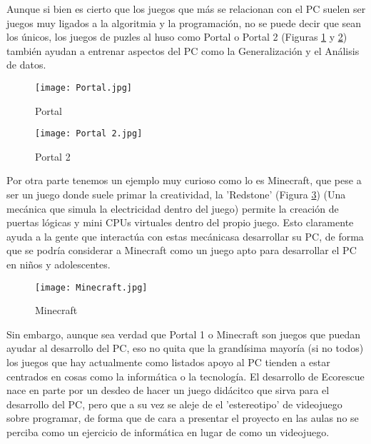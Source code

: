 Aunque si bien es cierto que los juegos que más se relacionan con el PC suelen ser juegos muy ligados a la algoritmia y la programación, no se puede decir que sean los únicos, los juegos de puzles al huso como Portal\cite{portal} o Portal 2\cite{portal2} (Figuras \ref{fig:portal} y \ref{fig:portal2}) también ayudan a entrenar aspectos del PC como la Generalización y el Análisis de datos.

\begin{figure}[H]
    \centering
      \texttt{[image: Portal.jpg]}
    \caption{Portal}
    \label{fig:portal}
\end{figure}

\begin{figure}[H]
    \centering
      \texttt{[image: Portal 2.jpg]}
    \caption{Portal 2}
    \label{fig:portal2}
\end{figure}

Por otra parte tenemos un ejemplo muy curioso como lo es Minecraft\cite{Minecraft}, que pese a ser un juego donde suele primar la creatividad, la 'Redstone' (Figura \ref{fig:minecraft}) (Una mecánica que simula la electricidad dentro del juego) permite la creación de puertas lógicas y mini CPUs virtuales dentro del propio juego. Esto claramente ayuda a la gente que interactúa con estas mecánicasa desarrollar su PC, de forma que se podría considerar a Minecraft como un juego apto para desarrollar el PC en niños y adolescentes.

\begin{figure}[H]
    \centering
      \texttt{[image: Minecraft.jpg]}
    \caption{Minecraft}
    \label{fig:minecraft}
\end{figure}


Sin embargo, aunque sea verdad que Portal 1 o Minecraft son juegos que puedan ayudar al desarrollo del PC, eso no quita que la grandísima mayoría (si no todos) los juegos que hay actualmente como listados apoyo al PC tienden a estar centrados en cosas como la informática o la tecnología. El desarrollo de Ecorescue nace en parte por un desdeo de hacer un juego didácitco que sirva para el desarrollo del PC, pero que a su vez se aleje de el 'estereotipo' de videojuego sobre programar, de forma que de cara a presentar el proyecto en las aulas no se perciba como un ejercicio de informática en lugar de como un videojuego.